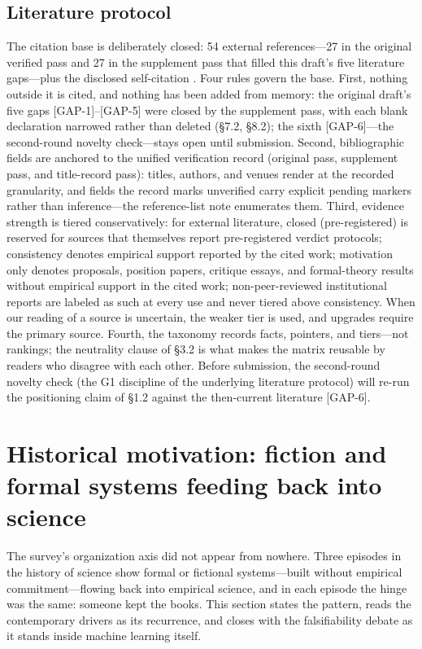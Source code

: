 \documentclass[11pt,a4paper]{article}
\begin{document}
\subsection{Literature protocol}

The citation base is deliberately closed: 54 external references—27 in the original verified pass and 27 in the supplement pass that filled this draft's five literature gaps—plus the disclosed self-citation \cite{key04}. Four rules govern the base. First, nothing outside it is cited, and nothing has been added from memory: the original draft's five gaps [GAP-1]–[GAP-5] were closed by the supplement pass, with each blank declaration narrowed rather than deleted (§7.2, §8.2); the sixth [GAP-6]—the second-round novelty check—stays open until submission. Second, bibliographic fields are anchored to the unified verification record (original pass, supplement pass, and title-record pass): titles, authors, and venues render at the recorded granularity, and fields the record marks unverified carry explicit pending markers rather than inference—the reference-list note enumerates them. Third, evidence strength is tiered conservatively: for external literature, closed (pre-registered) is reserved for sources that themselves report pre-registered verdict protocols; consistency denotes empirical support reported by the cited work; motivation only denotes proposals, position papers, critique essays, and formal-theory results without empirical support in the cited work; non-peer-reviewed institutional reports are labeled as such at every use and never tiered above consistency. When our reading of a source is uncertain, the weaker tier is used, and upgrades require the primary source. Fourth, the taxonomy records facts, pointers, and tiers—not rankings; the neutrality clause of §3.2 is what makes the matrix reusable by readers who disagree with each other. Before submission, the second-round novelty check (the G1 discipline of the underlying literature protocol) will re-run the positioning claim of §1.2 against the then-current literature [GAP-6].

\section{Historical motivation: fiction and formal systems feeding back into science}

The survey's organization axis did not appear from nowhere. Three episodes in the history of science show formal or fictional systems—built without empirical commitment—flowing back into empirical science, and in each episode the hinge was the same: someone kept the books. This section states the pattern, reads the contemporary drivers as its recurrence, and closes with the falsifiability debate as it stands inside machine learning itself.
\end{document}
